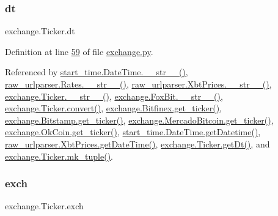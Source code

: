 \mbox{\label{classexchange_1_1_ticker_a45e3162d9956cee797f21d93c44c6baf}} 
\subsubsection{\texorpdfstring{dt}{dt}}
{\footnotesize\ttfamily exchange.\+Ticker.\+dt}



Definition at line \hyperlink{exchange_8py_source_l00059}{59} of file \hyperlink{exchange_8py_source}{exchange.\+py}.



Referenced by \hyperlink{start__time_2____init_____8py_source_l00034}{start\+\_\+time.\+Date\+Time.\+\_\+\+\_\+str\+\_\+\+\_\+()}, \hyperlink{raw__urlparser_8py_source_l00038}{raw\+\_\+urlparser.\+Rates.\+\_\+\+\_\+str\+\_\+\+\_\+()}, \hyperlink{raw__urlparser_8py_source_l00074}{raw\+\_\+urlparser.\+Xbt\+Prices.\+\_\+\+\_\+str\+\_\+\+\_\+()}, \hyperlink{exchange_8py_source_l00136}{exchange.\+Ticker.\+\_\+\+\_\+str\+\_\+\+\_\+()}, \hyperlink{exchange_8py_source_l00610}{exchange.\+Fox\+Bit.\+\_\+\+\_\+str\+\_\+\+\_\+()}, \hyperlink{exchange_8py_source_l00069}{exchange.\+Ticker.\+convert()}, \hyperlink{exchange_8py_source_l00439}{exchange.\+Bitfinex.\+get\+\_\+ticker()}, \hyperlink{exchange_8py_source_l00511}{exchange.\+Bitstamp.\+get\+\_\+ticker()}, \hyperlink{exchange_8py_source_l00651}{exchange.\+Mercado\+Bitcoin.\+get\+\_\+ticker()}, \hyperlink{exchange_8py_source_l00716}{exchange.\+Ok\+Coin.\+get\+\_\+ticker()}, \hyperlink{start__time_2____init_____8py_source_l00031}{start\+\_\+time.\+Date\+Time.\+get\+Datetime()}, \hyperlink{raw__urlparser_8py_source_l00059}{raw\+\_\+urlparser.\+Xbt\+Prices.\+get\+Date\+Time()}, \hyperlink{exchange_8py_source_l00097}{exchange.\+Ticker.\+get\+Dt()}, and \hyperlink{exchange_8py_source_l00121}{exchange.\+Ticker.\+mk\+\_\+tuple()}.

\mbox{\label{classexchange_1_1_ticker_a33f33fe9a12da3ce52938afdc577c061}} 
\subsubsection{\texorpdfstring{exch}{exch}}
{\footnotesize\ttfamily exchange.\+Ticker.\+exch}



